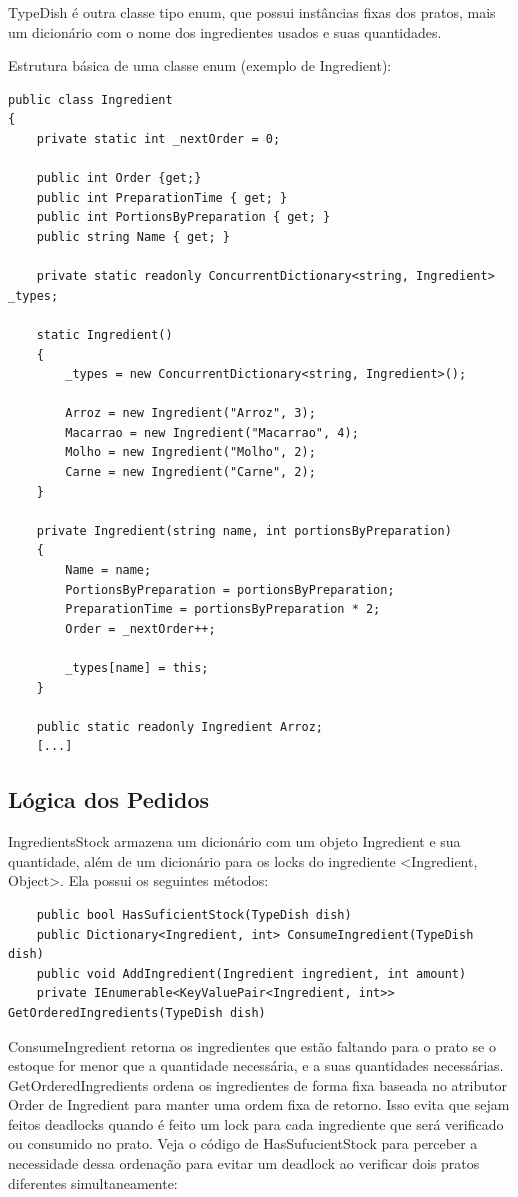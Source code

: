 \documentclass[
	12pt,				%
	oneside,			%
	a4paper,			%
	english,			%
	brazil,				%
	]{abntex2}
\begin{document}
{TypeDish é outra classe tipo enum, que possui instâncias fixas dos pratos, mais um dicionário com o nome dos ingredientes usados e suas quantidades.

Estrutura básica de uma classe enum (exemplo de Ingredient):

\begin{lstlisting}
public class Ingredient
{
    private static int _nextOrder = 0;

    public int Order {get;}
    public int PreparationTime { get; }
    public int PortionsByPreparation { get; }
    public string Name { get; }

    private static readonly ConcurrentDictionary<string, Ingredient> _types;

    static Ingredient()
    {
        _types = new ConcurrentDictionary<string, Ingredient>();

        Arroz = new Ingredient("Arroz", 3);
        Macarrao = new Ingredient("Macarrao", 4);
        Molho = new Ingredient("Molho", 2);
        Carne = new Ingredient("Carne", 2);
    }

    private Ingredient(string name, int portionsByPreparation)
    {
        Name = name;
        PortionsByPreparation = portionsByPreparation;
        PreparationTime = portionsByPreparation * 2;
        Order = _nextOrder++;

        _types[name] = this;
    }

    public static readonly Ingredient Arroz;
    [...]
\end{lstlisting}

\subsection{Lógica dos Pedidos}
IngredientsStock armazena um dicionário com um objeto Ingredient e sua quantidade, além de um dicionário para os locks do ingrediente <Ingredient, Object>. Ela possui os seguintes métodos:

\begin{lstlisting}
    public bool HasSuficientStock(TypeDish dish)
    public Dictionary<Ingredient, int> ConsumeIngredient(TypeDish dish)
    public void AddIngredient(Ingredient ingredient, int amount)
    private IEnumerable<KeyValuePair<Ingredient, int>> GetOrderedIngredients(TypeDish dish)
\end{lstlisting}

ConsumeIngredient retorna os ingredientes que estão faltando para o prato se o estoque for menor que a quantidade necessária, e a suas quantidades necessárias. GetOrderedIngredients ordena os ingredientes de forma fixa baseada no atributor Order de Ingredient para manter uma ordem fixa de retorno. Isso evita que sejam feitos deadlocks quando é feito um lock para cada ingrediente que será verificado ou consumido no prato. Veja o código de HasSufucientStock para perceber a necessidade dessa ordenação para evitar um deadlock ao verificar dois pratos diferentes simultaneamente:

}
\end{document}

